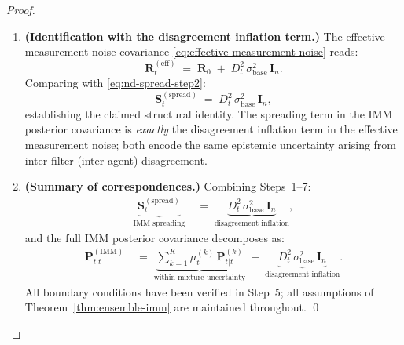 \documentclass[12pt,openany]{book}
\numberwithin{equation}{chapter}
\theoremstyle{plain}
\theoremstyle{definition}
\theoremstyle{remark}
\begin{document}
\begin{proof}
\begin{enumerate}
  \item \textbf{(Identification with the disagreement inflation
        term.)}
        The effective measurement-noise covariance
        \eqref{eq:effective-measurement-noise} reads:
        \begin{equation}
          \mathbf{R}_t^{(\mathrm{eff})}
          \;=\; \mathbf{R}_0
          \;+\; D_t^2\,\sigma_{\mathrm{base}}^2\,\mathbf{I}_n.
          \label{eq:Reff-recall}
        \end{equation}
        Comparing with \eqref{eq:nd-spread-step2}:
        \begin{equation}
          \mathbf{S}_t^{(\mathrm{spread})}
          \;=\; D_t^2\,\sigma_{\mathrm{base}}^2\,\mathbf{I}_n,
          \label{eq:spread-final-id}
        \end{equation}
        establishing the claimed structural identity.
        The spreading term in the IMM posterior covariance
        is \emph{exactly} the disagreement inflation term
        in the effective measurement noise; both encode the
        same epistemic uncertainty arising from inter-filter
        (inter-agent) disagreement.

  \item \textbf{(Summary of correspondences.)}
        Combining Steps~1--7:
        \begin{align}
          \underbrace{
            \mathbf{S}_t^{(\mathrm{spread})}
          }_{\text{IMM spreading}}
          &\;=\;
          \underbrace{
            D_t^2\,\sigma_{\mathrm{base}}^2\,\mathbf{I}_n
          }_{\text{disagreement inflation}},
          \label{eq:final-structural-identity}
        \end{align}
        and the full IMM posterior covariance decomposes as:
        \begin{align}
          \mathbf{P}_{t|t}^{(\mathrm{IMM})}
          &\;=\;
          \underbrace{
            \sum_{k=1}^{K} \mu_t^{(k)}\,
            \mathbf{P}_{t|t}^{(k)}
          }_{\text{within-mixture uncertainty}}
          \;+\;
          \underbrace{
            D_t^2\,\sigma_{\mathrm{base}}^2\,\mathbf{I}_n
          }_{\text{disagreement inflation}}.
          \label{eq:imm-decomp-final}
        \end{align}
        All boundary conditions have been verified in
        Step~5; all assumptions of
        Theorem~\ref{thm:ensemble-imm} are maintained
        throughout.  \qed

\end{enumerate}
\end{proof}
\end{document}
